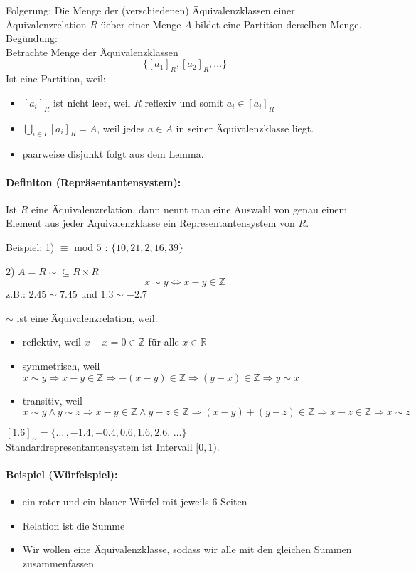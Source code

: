 Folgerung: Die Menge der (verschiedenen) \"Aquivalenzklassen einer \"Aquivalenzrelation $R$ \"ueber einer Menge $A$ bildet eine Partition derselben Menge.\\
Begündung:\\
Betrachte Menge der \"Aquivalenzklassen
\[
\{[a_1]_R,[a_2]_R,\ldots\}
\]
Ist eine Partition, weil:
\begin{itemize}
\item $[a_i]_R$ ist nicht leer, weil $R$ reflexiv und somit $a_i \in [a_i]_R$
\item $\bigcup_{i \in I} [a_i]_R = A$, weil jedes $a\in A$ in seiner \"Aquivalenzklasse liegt.
\item paarweise disjunkt folgt aus dem Lemma.
\end{itemize}
\paragraph{Definiton (Repr\"asentantensystem): }Ist $R$ eine Äquivalenzrelation, dann nennt man eine Auswahl von genau einem Element aus jeder Äquivalenzklasse ein Representantensystem von $R$.

Beispiel: 1) $\equiv$ mod $5$ : $\{10,21,2,16,39\}$


2) $A=R \sim \subseteq R \times R$
\[
x\sim y \Leftrightarrow x-y \in \mathbb{Z}
\]
z.B.: $2.45 \sim 7.45$ und $1.3 \sim -2.7$

$\sim$ ist eine Äquivalenzrelation, weil:
\begin{itemize}
\item reflektiv, weil $x-x = 0 \in \mathbb{Z}$ für alle $x\in\mathbb{R}$
\item symmetrisch, weil $x\sim y \Rightarrow x-y \in \mathbb{Z} \Rightarrow -(x-y) \in \mathbb{Z} \Rightarrow  (y-x) \in \mathbb{Z} \Rightarrow y\sim x$
\item transitiv, weil $x\sim y \land y\sim z \Rightarrow x-y \in \mathbb{Z} \land y-z \in \mathbb{Z} \Rightarrow (x-y)+(y-z)\in \mathbb{Z} \Rightarrow x-z \in \mathbb{Z} \Rightarrow x\sim z$
\end{itemize}

$[1.6]_{\sim} = \{ \ldots\, , -1.4, -0.4, 0.6, 1.6, 2.6,\, \ldots \}$\\
Standardrepresentantensystem ist Intervall $[0,1)$.


\paragraph{Beispiel (Würfelspiel): }
\begin{itemize}
\item ein roter und ein blauer Würfel mit jeweils $6$ Seiten
\item Relation ist die Summe
\item Wir wollen eine Äquivalenzklasse, sodass wir alle mit den gleichen Summen zusammenfassen
\end{itemize}

